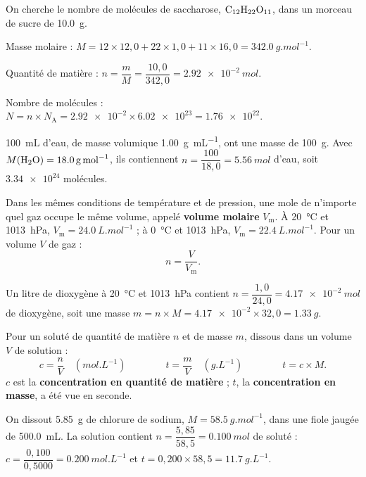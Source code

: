 \begin{savoirfaire}
On cherche le nombre de molécules de saccharose, $\ce{C12H22O11}$, dans un morceau de sucre de \qty{10,0}{g}.
\begin{questions}
\item Masse molaire : $M=12\times12{,}0+22\times1{,}0+11\times16{,}0=\qty{342,0}{g.mol^{-1}}$.
\item Quantité de matière : $n=\dfrac{m}{M}=\dfrac{10{,}0}{342{,}0}=\qty{2,92e-2}{mol}$.
\item Nombre de molécules : $N=n\times N_\mathrm{A}=\num{2.92e-2}\times\num{6.02e23}=\num{1.76e22}$.
\end{questions}
\end{savoirfaire}
\begin{exemple}
\qty{100}{mL} d'eau, de masse volumique \qty{1,00}{g.mL^{-1}}, ont une masse de \qty{100}{g}. Avec $M(\ce{H2O})=\qty{18,0}{g.mol^{-1}}$, ils contiennent
$n=\dfrac{100}{18{,}0}=\qty{5,56}{mol}$ d'eau, soit $\num{3.34e24}$ molécules.
\end{exemple}
\begin{loi}
Dans les mêmes conditions de température et de pression, une mole de n'importe quel gaz occupe le même volume, appelé
\textbf{volume molaire} $V_\mathrm{m}$. À \qty{20}{\degreeCelsius} et \qty{1013}{hPa}, $V_\mathrm{m}=\qty{24,0}{L.mol^{-1}}$ ; à \qty{0}{\degreeCelsius} et \qty{1013}{hPa}, $V_\mathrm{m}=\qty{22,4}{L.mol^{-1}}$. Pour un
volume $V$ de gaz :
\[n=\frac{V}{V_\mathrm{m}}.\]
\end{loi}
\begin{exemple}
Un litre de dioxygène à \qty{20}{\degreeCelsius} et \qty{1013}{hPa} contient $n=\dfrac{1{,}0}{24{,}0}=\qty{4,17e-2}{mol}$ de dioxygène, soit une masse
$m=n\times M=\num{4.17e-2}\times32{,}0=\qty{1,33}{g}$.
\end{exemple}
\begin{definition}
Pour un soluté de quantité de matière $n$ et de masse $m$, dissous dans un volume $V$ de solution :
\[c=\frac{n}{V}\quad(\unit{mol.L^{-1}})\qquad\qquad t=\frac{m}{V}\quad(\unit{g.L^{-1}})\qquad\qquad t=c\times M.\]
$c$ est la \textbf{concentration en quantité de matière} ; $t$, la \textbf{concentration en masse}, a été vue en seconde.
\end{definition}
\begin{exemple}
On dissout \qty{5,85}{g} de chlorure de sodium, $M=\qty{58,5}{g.mol^{-1}}$, dans une fiole jaugée de \qty{500,0}{mL}. La solution contient
$n=\dfrac{5{,}85}{58{,}5}=\qty{0,100}{mol}$ de soluté : $c=\dfrac{0{,}100}{0{,}5000}=\qty{0,200}{mol.L^{-1}}$ et $t=0{,}200\times58{,}5=\qty{11,7}{g.L^{-1}}$.
\end{exemple}
